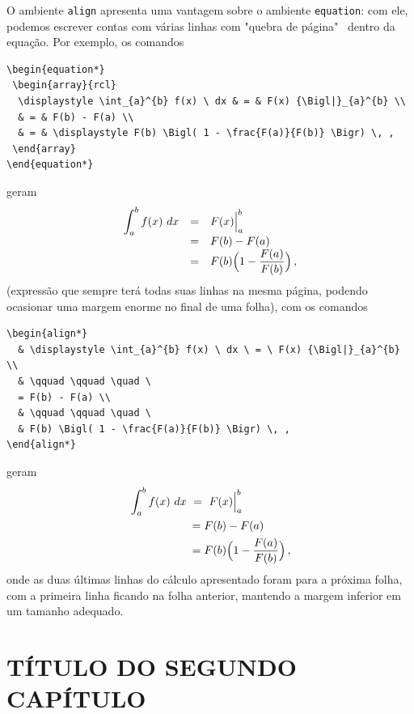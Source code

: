 \documentclass[a4paper,12pt]{report}%
\begin{document}
O ambiente \verb|align| apresenta uma vantagem sobre o ambiente \verb|equation|: com ele, podemos escrever contas com várias linhas com "quebra de página" \ dentro da equação.  
Por exemplo, os comandos 
\begin{verbatim}
\begin{equation*}
 \begin{array}{rcl}
  \displaystyle \int_{a}^{b} f(x) \ dx & = & F(x) {\Bigl|}_{a}^{b} \\
  & = & F(b) - F(a) \\
  & = & \displaystyle F(b) \Bigl( 1 - \frac{F(a)}{F(b)} \Bigr) \, ,
 \end{array}
\end{equation*}
\end{verbatim}
geram
\begin{equation*}
 \begin{array}{rcl}
  \displaystyle \int_{a}^{b} f(x) \ dx & = & F(x) {\Bigl|}_{a}^{b} \\
  & = & F(b) - F(a) \\
  & = & \displaystyle F(b) \Bigl( 1 - \frac{F(a)}{F(b)} \Bigr) \, ,
 \end{array}
\end{equation*}
(expressão que sempre terá todas suas linhas na mesma página, podendo ocasionar uma margem enorme no final de uma folha), com os comandos 
\begin{verbatim}
\begin{align*}
  & \displaystyle \int_{a}^{b} f(x) \ dx \ = \ F(x) {\Bigl|}_{a}^{b} \\
  & \qquad \qquad \quad \
  = F(b) - F(a) \\
  & \qquad \qquad \quad \
  & F(b) \Bigl( 1 - \frac{F(a)}{F(b)} \Bigr) \, ,
\end{align*}
\end{verbatim}
geram 
\begin{align*}
  & \displaystyle \int_{a}^{b} f(x) \ dx \ = \ F(x) {\Bigl|}_{a}^{b} \\
  & \qquad \qquad \quad \
  = F(b) - F(a) \\
  & \qquad \qquad \quad \
  = F(b) \Bigl( 1 - \frac{F(a)}{F(b)} \Bigr) \, ,
\end{align*}
onde as duas últimas linhas do cálculo apresentado foram para a próxima folha, com a primeira linha ficando na folha anterior, mantendo a margem inferior em um tamanho adequado. 

%
%

\chapter{TÍTULO DO SEGUNDO CAPÍTULO}\label{Cap2}
\end{document}
